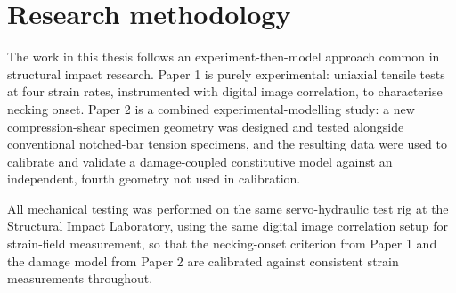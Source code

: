 \chapter{Research methodology}
\label{Ch:Methodology}

The work in this thesis follows an experiment-then-model approach common in
structural impact research. Paper 1 is purely experimental: uniaxial tensile
tests at four strain rates, instrumented with digital image correlation, to
characterise necking onset. Paper 2 is a combined experimental-modelling
study: a new compression-shear specimen geometry was designed and tested
alongside conventional notched-bar tension specimens, and the resulting data
were used to calibrate and validate a damage-coupled constitutive model
against an independent, fourth geometry not used in calibration.

All mechanical testing was performed on the same servo-hydraulic test rig at
the Structural Impact Laboratory, using the same digital image correlation
setup for strain-field measurement, so that the necking-onset criterion from
Paper 1 and the damage model from Paper 2 are calibrated against consistent
strain measurements throughout.

